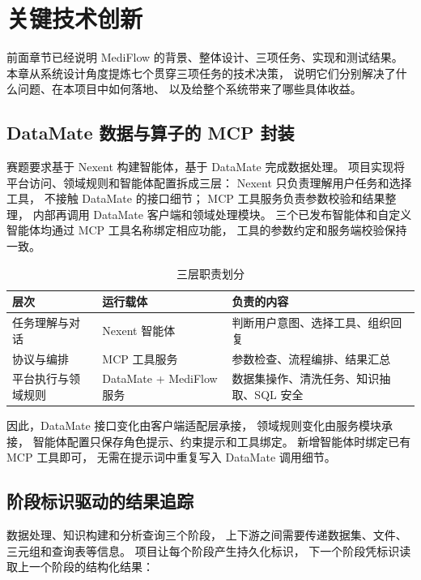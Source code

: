 \chapter{关键技术创新}

前面章节已经说明 MediFlow 的背景、整体设计、三项任务、实现和测试结果。
本章从系统设计角度提炼七个贯穿三项任务的技术决策，
说明它们分别解决了什么问题、在本项目中如何落地、
以及给整个系统带来了哪些具体收益。

\section{DataMate 数据与算子的 MCP 封装}

赛题要求基于 Nexent 构建智能体，基于 DataMate 完成数据处理。
项目实现将平台访问、领域规则和智能体配置拆成三层：
Nexent 只负责理解用户任务和选择工具，
不接触 DataMate 的接口细节；
MCP 工具服务负责参数校验和结果整理，
内部再调用 DataMate 客户端和领域处理模块。
三个已发布智能体和自定义智能体均通过 MCP 工具名称绑定相应功能，
工具的参数约定和服务端校验保持一致。

\begin{table}[H]
\centering
\caption{三层职责划分}
\label{tab:three-layer}
\begin{tabularx}{\textwidth}{L{2.8cm}L{4.0cm}Y}
\toprule
\textbf{层次} & \textbf{运行载体} & \textbf{负责的内容} \\
\midrule
任务理解与对话 & Nexent 智能体 & 判断用户意图、选择工具、组织回复 \\
\addlinespace
协议与编排 & MCP 工具服务 & 参数检查、流程编排、结果汇总 \\
\addlinespace
平台执行与领域规则 &
DataMate + MediFlow 服务 &
数据集操作、清洗任务、知识抽取、SQL 安全 \\
\bottomrule
\end{tabularx}
\end{table}

因此，DataMate 接口变化由客户端适配层承接，
领域规则变化由服务模块承接，
智能体配置只保存角色提示、约束提示和工具绑定。
新增智能体时绑定已有 MCP 工具即可，
无需在提示词中重复写入 DataMate 调用细节。

\section{阶段标识驱动的结果追踪}

数据处理、知识构建和分析查询三个阶段，
上下游之间需要传递数据集、文件、三元组和查询表等信息。
项目让每个阶段产生持久化标识，
下一个阶段凭标识读取上一个阶段的结构化结果：

